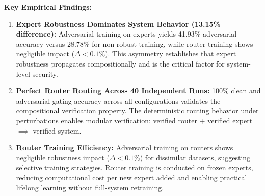 \documentclass[11pt,a4paper]{article}
\begin{document}
\textbf{Key Empirical Findings:}
\begin{enumerate}
    \item \textbf{Expert Robustness Dominates System Behavior (13.15\% difference):} Adversarial training on experts yields 41.93\% adversarial accuracy versus 28.78\% for non-robust training, while router training shows negligible impact ($\Delta < 0.1\%$). This asymmetry establishes that expert robustness propagates compositionally and is the critical factor for system-level security.

    \item \textbf{Perfect Router Routing Across 40 Independent Runs:} 100\% clean and adversarial gating accuracy across all configurations validates the compositional verification property. The deterministic routing behavior under perturbations enables modular verification: verified router + verified expert $\implies$ verified system.

    \item \textbf{Router Training Efficiency:} Adversarial training on routers shows negligible robustness impact ($\Delta < 0.1\%$) for dissimilar datasets, suggesting selective training strategies. Router training is conducted on frozen experts, reducing computational cost per new expert added and enabling practical lifelong learning without full-system retraining.
\end{enumerate}
\end{document}
